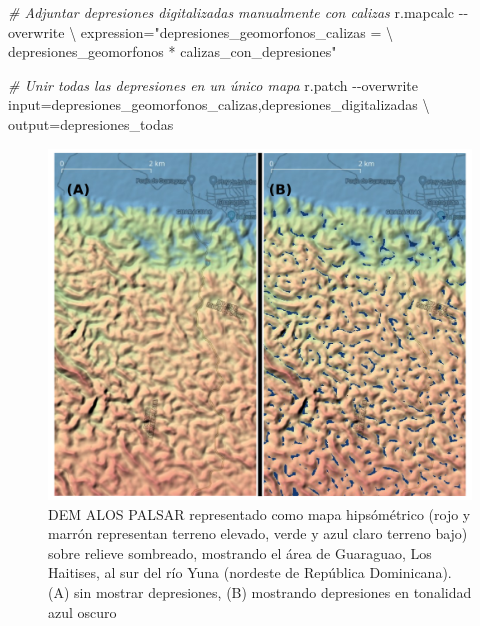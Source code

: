 \documentclass[spanish]{article}
\newenvironment{Shaded}{\begin{snugshade}}{\end{snugshade}}
\newcommand{\AttributeTok}[1]{\textcolor[rgb]{0.77,0.63,0.00}{#1}}
\newcommand{\CommentTok}[1]{\textcolor[rgb]{0.56,0.35,0.01}{\textit{#1}}}
\newcommand{\DataTypeTok}[1]{\textcolor[rgb]{0.13,0.29,0.53}{#1}}
\newcommand{\ExtensionTok}[1]{#1}
\newcommand{\NormalTok}[1]{#1}
\newcommand{\StringTok}[1]{\textcolor[rgb]{0.31,0.60,0.02}{#1}}
\begin{document}
\begin{Shaded}
\begin{Highlighting}[]
\CommentTok{\# Adjuntar depresiones digitalizadas manualmente con calizas}
\ExtensionTok{r.mapcalc} \AttributeTok{{-}{-}overwrite} \DataTypeTok{\textbackslash{}}
\NormalTok{  expression=}\StringTok{"\textquotesingle{}depresiones\_geomorfonos\_calizas\textquotesingle{} = }\DataTypeTok{\textbackslash{}}
\StringTok{              \textquotesingle{}depresiones\_geomorfonos\textquotesingle{} * \textquotesingle{}calizas\_con\_depresiones\textquotesingle{}"}

\CommentTok{\# Unir todas las depresiones en un único mapa}
\ExtensionTok{r.patch} \AttributeTok{{-}{-}overwrite}\NormalTok{ input=depresiones\_geomorfonos\_calizas,depresiones\_digitalizadas }\DataTypeTok{\textbackslash{}}
\NormalTok{  output=depresiones\_todas}
\end{Highlighting}
\end{Shaded}

\begin{figure}

{\centering \includegraphics[width=1\linewidth]{figuras/depresiones} 

}

\caption{DEM ALOS PALSAR representado como mapa hipsómétrico (rojo y marrón representan terreno elevado, verde y azul claro terreno bajo) sobre relieve sombreado, mostrando el área de Guaraguao, Los Haitises, al sur del río Yuna (nordeste de República Dominicana). (A) sin mostrar depresiones, (B) mostrando depresiones en tonalidad azul oscuro}\label{fig:depresiones}
\end{figure}
\end{document}
